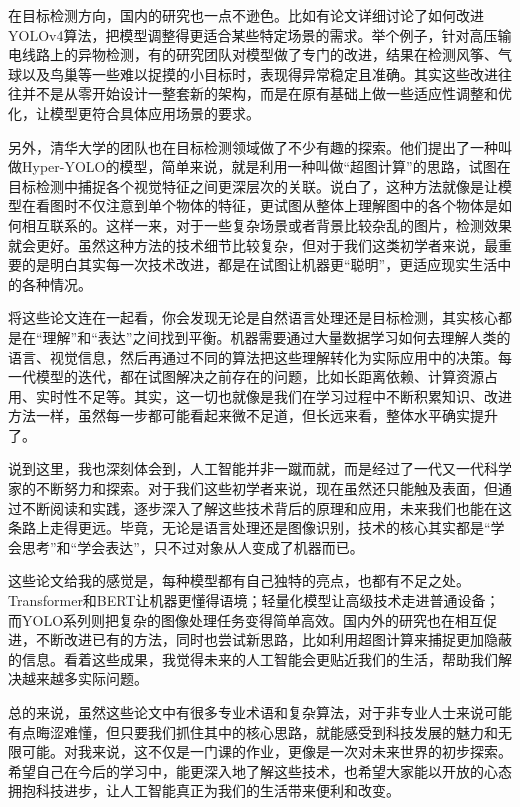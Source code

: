 \documentclass{article}
\begin{document}
在目标检测方向，国内的研究也一点不逊色。比如有论文详细讨论了如何改进YOLOv4算法，把模型调整得更适合某些特定场景的需求。举个例子，针对高压输电线路上的异物检测，有的研究团队对模型做了专门的改进，结果在检测风筝、气球以及鸟巢等一些难以捉摸的小目标时，表现得异常稳定且准确。其实这些改进往往并不是从零开始设计一整套新的架构，而是在原有基础上做一些适应性调整和优化，让模型更符合具体应用场景的要求。

另外，清华大学的团队也在目标检测领域做了不少有趣的探索。他们提出了一种叫做Hyper-YOLO的模型，简单来说，就是利用一种叫做“超图计算”的思路，试图在目标检测中捕捉各个视觉特征之间更深层次的关联。说白了，这种方法就像是让模型在看图时不仅注意到单个物体的特征，更试图从整体上理解图中的各个物体是如何相互联系的。这样一来，对于一些复杂场景或者背景比较杂乱的图片，检测效果就会更好。虽然这种方法的技术细节比较复杂，但对于我们这类初学者来说，最重要的是明白其实每一次技术改进，都是在试图让机器更“聪明”，更适应现实生活中的各种情况。

将这些论文连在一起看，你会发现无论是自然语言处理还是目标检测，其实核心都是在“理解”和“表达”之间找到平衡。机器需要通过大量数据学习如何去理解人类的语言、视觉信息，然后再通过不同的算法把这些理解转化为实际应用中的决策。每一代模型的迭代，都在试图解决之前存在的问题，比如长距离依赖、计算资源占用、实时性不足等。其实，这一切也就像是我们在学习过程中不断积累知识、改进方法一样，虽然每一步都可能看起来微不足道，但长远来看，整体水平确实提升了。

说到这里，我也深刻体会到，人工智能并非一蹴而就，而是经过了一代又一代科学家的不断努力和探索。对于我们这些初学者来说，现在虽然还只能触及表面，但通过不断阅读和实践，逐步深入了解这些技术背后的原理和应用，未来我们也能在这条路上走得更远。毕竟，无论是语言处理还是图像识别，技术的核心其实都是“学会思考”和“学会表达”，只不过对象从人变成了机器而已。

这些论文给我的感觉是，每种模型都有自己独特的亮点，也都有不足之处。Transformer和BERT让机器更懂得语境；轻量化模型让高级技术走进普通设备；而YOLO系列则把复杂的图像处理任务变得简单高效。国内外的研究也在相互促进，不断改进已有的方法，同时也尝试新思路，比如利用超图计算来捕捉更加隐蔽的信息。看着这些成果，我觉得未来的人工智能会更贴近我们的生活，帮助我们解决越来越多实际问题。

总的来说，虽然这些论文中有很多专业术语和复杂算法，对于非专业人士来说可能有点晦涩难懂，但只要我们抓住其中的核心思路，就能感受到科技发展的魅力和无限可能。对我来说，这不仅是一门课的作业，更像是一次对未来世界的初步探索。希望自己在今后的学习中，能更深入地了解这些技术，也希望大家能以开放的心态拥抱科技进步，让人工智能真正为我们的生活带来便利和改变。
\end{document}

